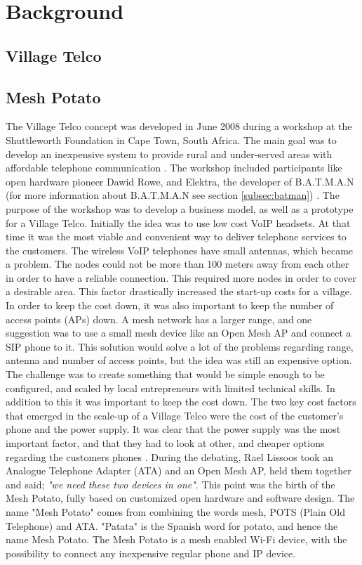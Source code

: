 \chapter{Background}
\label{chp:background} 

\section{Village Telco}


\section{Mesh Potato}

The Village Telco concept was developed in June 2008 during a workshop at the Shuttleworth Foundation in Cape Town, South Africa. The main goal was to develop an inexpensive system to provide rural and under-served areas with affordable telephone communication \cite{MParticle}. The workshop included participants like open hardware pioneer Dawid Rowe, and Elektra, the developer of B.A.T.M.A.N (for more information about B.A.T.M.A.N see section \ref{subsec:batman}) \cite{MPworkshop}. The purpose of the workshop was to develop a business model, as well as a prototype for a Village Telco. Initially the idea was to use low cost VoIP headsets. At that time it was the most viable and convenient way to deliver telephone services to the customers. The wireless VoIP telephones have small antennas, which became a problem. The nodes could not be more than 100 meters away from each other in order to have a reliable connection. This required more nodes in order to cover a desirable area. This factor drastically increased the start-up costs for a village. In order to keep the cost down, it was also important to keep the number of access points (APs) down. A mesh network has a larger range, and one suggestion was to use a small mesh device like an Open Mesh AP and connect a SIP phone to it. This solution would solve a lot of the problems regarding range, antenna and number of access points, but the idea was still an expensive option. The challenge was to create something that would be simple enough to be configured, and scaled by local entrepreneurs with limited technical skills. In addition to this it was important to keep the cost down. The two key cost factors that emerged in the scale-up of a Village Telco were the cost of the customer's phone and the power supply. It was clear that the power supply was the most important factor, and that they had to look at other, and cheaper options regarding the customers phones \cite{MPworkshop}. During the debating, Rael Lissoos took an Analogue Telephone Adapter (ATA) and an Open Mesh AP, held them together and said; \textit{"we need these two devices in one"}. This point was the birth of the Mesh Potato, fully based on customized open hardware and software design. The name "Mesh Potato" comes from combining the words mesh, POTS (Plain Old Telephone) and ATA. "Patata" is the Spanish word for potato, and hence the name Mesh Potato. The Mesh Potato is a mesh enabled Wi-Fi device, with the possibility to connect any inexpensive regular phone and IP device. \cite{MPorigin}

